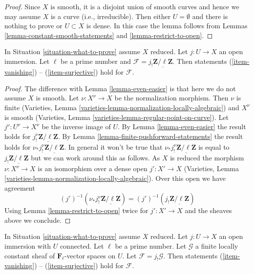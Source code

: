 \begin{proof}
Since $X$ is smooth, it is a disjoint union of smooth curves
and hence we may assume $X$ is a curve (i.e., irreducible).
Then either $U = \emptyset$ and there is nothing to prove
or $U \subset X$ is dense. In this case the lemma follows from
Lemmas \ref{lemma-constant-smooth-statements} and
\ref{lemma-restrict-to-open}.
\end{proof}

\begin{lemma}
\label{lemma-somewhat-easier}
In Situation \ref{situation-what-to-prove} assume $X$ reduced.
Let $j : U \to X$ an open immersion. Let $\ell$ be a prime number
and $\mathcal{F} = j_!\underline{\mathbf{Z}/\ell\mathbf{Z}}$.
Then statements (\ref{item-vanishing}) -- (\ref{item-surjective}) hold
for $\mathcal{F}$.
\end{lemma}

\begin{proof}
The difference with Lemma \ref{lemma-even-easier} is that here we do not
assume $X$ is smooth. Let $\nu : X^\nu \to X$ be the normalization
morphism. Then $\nu$ is finite
(Varieties, Lemma \ref{varieties-lemma-normalization-locally-algebraic})
and $X^\nu$ is smooth
(Varieties, Lemma \ref{varieties-lemma-regular-point-on-curve}).
Let $j^\nu : U^\nu \to X^\nu$ be the inverse image of $U$.
By Lemma \ref{lemma-even-easier} the result holds for
$j^\nu_!\underline{\mathbf{Z}/\ell\mathbf{Z}}$.
By Lemma \ref{lemma-finite-pushforward-statements}
the result holds for $\nu_*j^\nu_!\underline{\mathbf{Z}/\ell\mathbf{Z}}$.
In general it won't be true that
$\nu_*j^\nu_!\underline{\mathbf{Z}/\ell\mathbf{Z}}$ is equal to
$j_!\underline{\mathbf{Z}/\ell\mathbf{Z}}$
but we can work around this as follows.
As $X$ is reduced the morphism $\nu : X^\nu \to X$
is an isomorphism over a dense open $j' : X' \to X$
(Varieties, Lemma \ref{varieties-lemma-normalization-locally-algebraic}).
Over this open we have agreement
$$
(j')^{-1}(\nu_*j^\nu_!\underline{\mathbf{Z}/\ell\mathbf{Z}})
=
(j')^{-1}(j_!\underline{\mathbf{Z}/\ell\mathbf{Z}})
$$
Using Lemma \ref{lemma-restrict-to-open}
twice for $j' : X' \to X$ and the sheaves above
we conclude.
\end{proof}

\begin{lemma}
\label{lemma-vanishing-easier}
In Situation \ref{situation-what-to-prove} assume $X$ reduced.
Let $j : U \to X$ an open immersion with $U$ connected. Let
$\ell$ be a prime number. Let $\mathcal{G}$ a finite locally
constant sheaf of $\mathbf{F}_\ell$-vector spaces on $U$. Let
$\mathcal{F} = j_!\mathcal{G}$. Then statements
(\ref{item-vanishing}) -- (\ref{item-surjective}) hold for $\mathcal{F}$.
\end{lemma}

